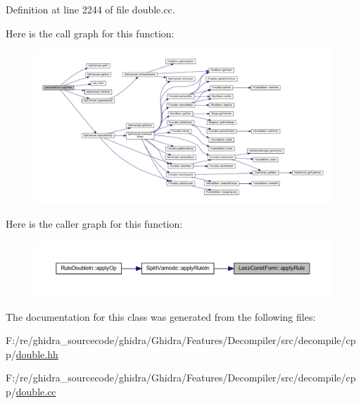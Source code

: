 Definition at line 2244 of file double.\+cc.

Here is the call graph for this function\+:
\nopagebreak
\begin{figure}[H]
\begin{center}
\leavevmode
\includegraphics[width=350pt]{class_less_const_form_a9cbb914fa234280574f936cb6a662fc4_cgraph}
\end{center}
\end{figure}
Here is the caller graph for this function\+:
\nopagebreak
\begin{figure}[H]
\begin{center}
\leavevmode
\includegraphics[width=350pt]{class_less_const_form_a9cbb914fa234280574f936cb6a662fc4_icgraph}
\end{center}
\end{figure}


The documentation for this class was generated from the following files\+:\begin{DoxyCompactItemize}
\item 
F\+:/re/ghidra\+\_\+sourcecode/ghidra/\+Ghidra/\+Features/\+Decompiler/src/decompile/cpp/\mbox{\hyperlink{double_8hh}{double.\+hh}}\item 
F\+:/re/ghidra\+\_\+sourcecode/ghidra/\+Ghidra/\+Features/\+Decompiler/src/decompile/cpp/\mbox{\hyperlink{double_8cc}{double.\+cc}}\end{DoxyCompactItemize}
